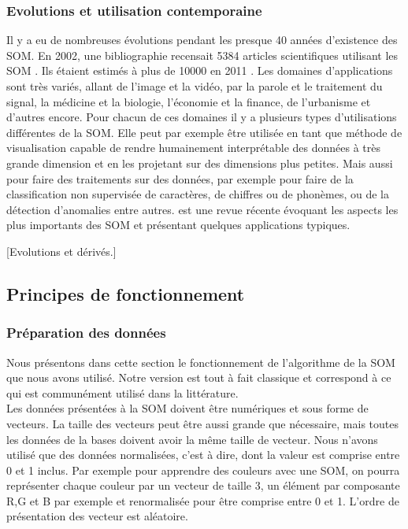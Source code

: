 \subsubsection{Evolutions et utilisation contemporaine}
	Il y a eu de nombreuses évolutions pendant les presque 40 années d'existence des SOM. En 2002, une bibliographie recensait 5384 articles scientifiques utilisant les SOM \cite{oja2003bibliography}. Ils étaient estimés à plus de 10000 en 2011 \cite{bilbiography-finuni}. Les domaines d'applications sont très variés, allant de l'image et la vidéo, par la parole et le traitement du signal, la médicine et la biologie, l'économie et la finance, de l'urbanisme et d'autres encore. Pour chacun de ces domaines il y a plusieurs types d'utilisations différentes de la SOM. Elle peut par exemple être utilisée en tant que méthode de visualisation capable de rendre humainement interprétable des données à très grande dimension et en les projetant sur des dimensions plus petites. Mais aussi pour faire des traitements sur des données, par exemple pour faire de la classification non supervisée de caractères, de chiffres ou de phonèmes, ou de la détection d'anomalies entre autres. \cite{cottrell2018self} est une revue récente évoquant les aspects les plus importants des SOM et présentant quelques applications typiques. 

	[Evolutions et dérivés.]

\subsection{Principes de fonctionnement}
\subsubsection{Préparation des données}

	Nous présentons dans cette section le fonctionnement de l'algorithme de la SOM que nous avons utilisé. Notre version est tout à fait classique et correspond à ce qui est communément utilisé dans la littérature.\\

	Les données présentées à la SOM doivent être numériques et sous forme de vecteurs. La taille des vecteurs peut être aussi grande que nécessaire, mais toutes les données de la bases doivent avoir la même taille de vecteur. Nous n'avons utilisé que des données normalisées, c'est à dire, dont la valeur est comprise entre 0 et 1 inclus. Par exemple pour apprendre des couleurs avec une SOM, on pourra représenter chaque couleur par un vecteur de taille 3, un élément par composante R,G et B par exemple et renormalisée pour être comprise entre 0 et 1. L'ordre de présentation des vecteur est aléatoire.

